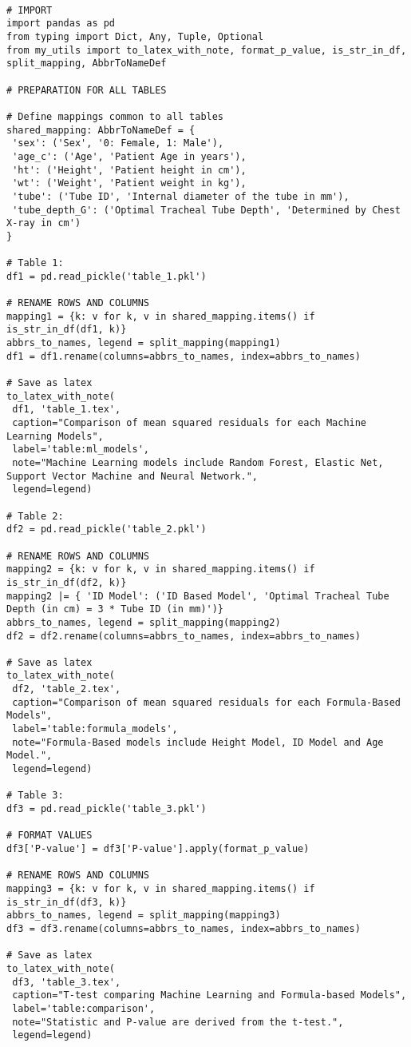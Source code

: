 \documentclass[11pt]{article}
\begin{document}
\begin{verbatim}

# IMPORT
import pandas as pd
from typing import Dict, Any, Tuple, Optional
from my_utils import to_latex_with_note, format_p_value, is_str_in_df, split_mapping, AbbrToNameDef

# PREPARATION FOR ALL TABLES

# Define mappings common to all tables
shared_mapping: AbbrToNameDef = {
 'sex': ('Sex', '0: Female, 1: Male'),
 'age_c': ('Age', 'Patient Age in years'),
 'ht': ('Height', 'Patient height in cm'),
 'wt': ('Weight', 'Patient weight in kg'),
 'tube': ('Tube ID', 'Internal diameter of the tube in mm'),
 'tube_depth_G': ('Optimal Tracheal Tube Depth', 'Determined by Chest X-ray in cm')
}

# Table 1:
df1 = pd.read_pickle('table_1.pkl')

# RENAME ROWS AND COLUMNS
mapping1 = {k: v for k, v in shared_mapping.items() if is_str_in_df(df1, k)} 
abbrs_to_names, legend = split_mapping(mapping1)
df1 = df1.rename(columns=abbrs_to_names, index=abbrs_to_names)

# Save as latex
to_latex_with_note(
 df1, 'table_1.tex',
 caption="Comparison of mean squared residuals for each Machine Learning Models", 
 label='table:ml_models',
 note="Machine Learning models include Random Forest, Elastic Net, Support Vector Machine and Neural Network.",
 legend=legend)

# Table 2:
df2 = pd.read_pickle('table_2.pkl')

# RENAME ROWS AND COLUMNS
mapping2 = {k: v for k, v in shared_mapping.items() if is_str_in_df(df2, k)} 
mapping2 |= { 'ID Model': ('ID Based Model', 'Optimal Tracheal Tube Depth (in cm) = 3 * Tube ID (in mm)')}
abbrs_to_names, legend = split_mapping(mapping2)
df2 = df2.rename(columns=abbrs_to_names, index=abbrs_to_names)

# Save as latex
to_latex_with_note(
 df2, 'table_2.tex',
 caption="Comparison of mean squared residuals for each Formula-Based Models", 
 label='table:formula_models',
 note="Formula-Based models include Height Model, ID Model and Age Model.",
 legend=legend)

# Table 3:
df3 = pd.read_pickle('table_3.pkl')

# FORMAT VALUES
df3['P-value'] = df3['P-value'].apply(format_p_value)

# RENAME ROWS AND COLUMNS
mapping3 = {k: v for k, v in shared_mapping.items() if is_str_in_df(df3, k)} 
abbrs_to_names, legend = split_mapping(mapping3)
df3 = df3.rename(columns=abbrs_to_names, index=abbrs_to_names)

# Save as latex
to_latex_with_note(
 df3, 'table_3.tex',
 caption="T-test comparing Machine Learning and Formula-based Models", 
 label='table:comparison',
 note="Statistic and P-value are derived from the t-test.",
 legend=legend)

\end{verbatim}
\end{document}

